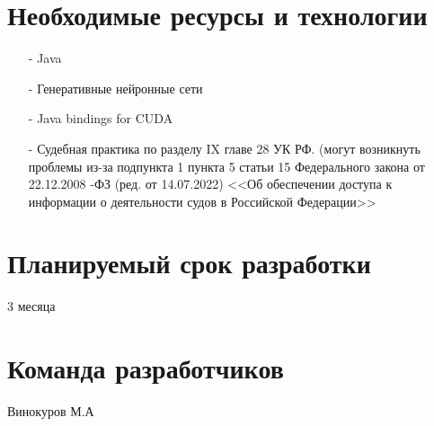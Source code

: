 \documentclass[a4paper,12pt]{extarticle}
\begin{document}
\section{Необходимые ресурсы и технологии}
\begin{itemize}
    \item[-] Java
    \item[-] Генеративные нейронные сети
    \item[-] Java bindings for CUDA
    \item[-] Судебная практика по разделу IX главе 28 УК РФ. (могут возникнуть проблемы из-за подпункта 1 пункта 5 статьи 15 Федерального закона от 22.12.2008 -ФЗ (ред. от 14.07.2022) <<Об обеспечении доступа к информации о деятельности судов в Российской Федерации>>
\end{itemize}
\section{Планируемый срок разработки}
3 месяца
\section{Команда разработчиков}
Винокуров М.А
\end{document}
